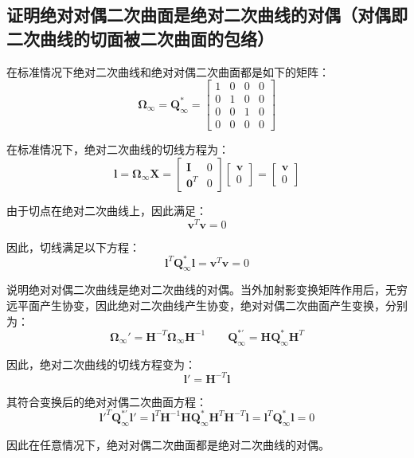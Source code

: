 \documentclass[11pt]{article}
\begin{document}
\subsection{证明绝对对偶二次曲面是绝对二次曲线的对偶（对偶即二次曲线的切面被二次曲面的包络）}
在标准情况下绝对二次曲线和绝对对偶二次曲面都是如下的矩阵：
\begin{equation*}
  \mathbold{\Omega}_\infty=\mathbold{Q}^*_\infty=\begin{bmatrix}
    1 & 0 & 0 & 0 \\
    0 & 1 & 0 & 0 \\
    0 & 0 & 1 & 0 \\
    0 & 0 & 0 & 0
  \end{bmatrix}
\end{equation*}\par
在标准情况下，绝对二次曲线的切线方程为：
\begin{equation*}
\mathbold{l}=\mathbold{\Omega}_\infty\mathbold{X}=\begin{bmatrix}
  \mathbf{I} & 0 \\
  \mathbf{0}^T         & 0
\end{bmatrix}\begin{bmatrix}
  \mathbf{v}\\ 0
\end{bmatrix}=\begin{bmatrix}
  \mathbf{v}\\ 0
\end{bmatrix}
\end{equation*}\par
由于切点在绝对二次曲线上，因此满足：
\begin{equation*}
  \mathbold{v}^T\mathbold{v}=0
\end{equation*}\par
因此，切线满足以下方程：
\begin{equation*}
  \mathbf{l}^T\mathbf{Q}_\infty^*\mathbf{l}=\mathbf{v}^T\mathbf{v}=0
\end{equation*}\par
说明绝对对偶二次曲线是绝对二次曲线的对偶。当外加射影变换矩阵作用后，无穷远平面产生协变，因此绝对二次曲线产生协变，绝对对偶二次曲面产生变换，分别为：
\begin{equation*}
  \mathbold{\Omega}_\infty'=\mathbold{H}^{-T}\mathbold{\Omega}_\infty\mathbold{H}^{-1}\qquad\mathbold{Q}_\infty^{*'}=\mathbold{H}\mathbold{Q}_\infty^*\mathbold{H}^T
\end{equation*}\par
因此，绝对二次曲线的切线方程变为：
\begin{equation*}
  \mathbold{l}'=\mathbf{H}^{-T}\mathbf{l}
\end{equation*}\par
其符合变换后的绝对对偶二次曲面方程：
\begin{equation*}
  \mathbf{l}'^T\mathbf{Q}_\infty^{*'}\mathbf{l}'=\mathbf{l}^T\mathbf{H}^{-1}\mathbf{H}\mathbf{Q}_\infty^*\mathbf{H}^T\mathbf{H}^{-T}\mathbf{l}=\mathbf{l}^T\mathbf{Q}_\infty^*\mathbf{l}=0
\end{equation*}\par
因此在任意情况下，绝对对偶二次曲面都是绝对二次曲线的对偶。
\end{document}
